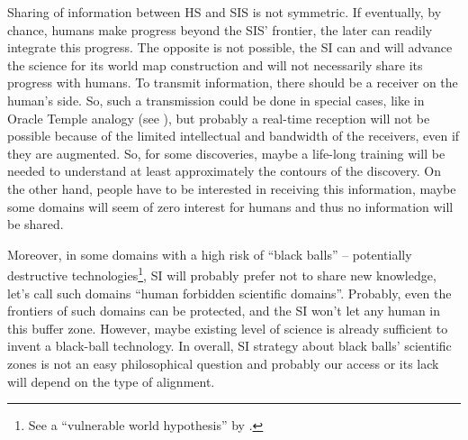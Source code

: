 \documentclass[a4paper,11pt]{article}
\begin{document}
Sharing of information between HS and SIS is not symmetric. If eventually, by chance, humans make progress beyond the SIS' frontier, the later can readily integrate this progress. The opposite is not possible, the SI can and will advance the science for its world map construction and will not necessarily share its progress with humans. To transmit information, there should be a receiver on the human's side. So, such a transmission could be done in special cases, like in Oracle Temple analogy (see ), but probably a real-time reception will not be possible because of the limited intellectual and bandwidth of the receivers, even if they are augmented. So, for some discoveries, maybe a life-long training will be needed to understand at least approximately the contours of the discovery. On the other hand, people have to be interested in receiving this information, maybe some domains will seem of zero interest for humans and thus no information will be shared. 

Moreover, in some domains with a high risk of ``black balls'' -- potentially destructive technologies\footnote{See a ``vulnerable world hypothesis'' by \textcite{VulnerableWorldHypothesis}.}, SI will probably prefer not to share new knowledge, let's call such domains ``human forbidden scientific domains''. Probably, even the frontiers of such domains can be protected, and the SI won't let any human in this buffer zone. However, maybe existing level of science is already sufficient to invent a black-ball technology. In overall, SI strategy about black balls' scientific zones is not an easy philosophical question and probably our access or its lack will depend on the type of alignment. 
\end{document}
